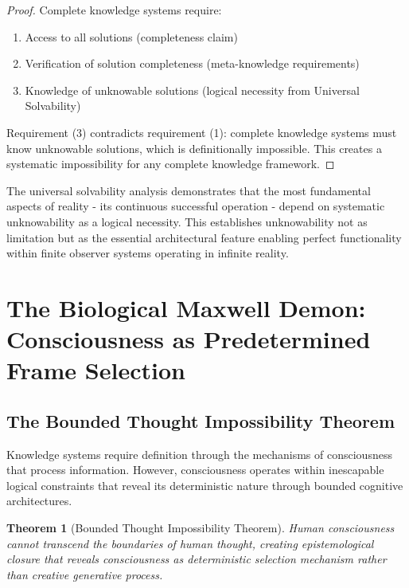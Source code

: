 \documentclass[12pt,a4paper]{article}
\newtheorem{theorem}{Theorem}[section]
\begin{document}
\begin{proof}
Complete knowledge systems require:
\begin{enumerate}
\item Access to all solutions (completeness claim)
\item Verification of solution completeness (meta-knowledge requirements)
\item Knowledge of unknowable solutions (logical necessity from Universal Solvability)
\end{enumerate}

Requirement (3) contradicts requirement (1): complete knowledge systems must know unknowable solutions, which is definitionally impossible. This creates a systematic impossibility for any complete knowledge framework.
\end{proof}

The universal solvability analysis demonstrates that the most fundamental aspects of reality - its continuous successful operation - depend on systematic unknowability as a logical necessity. This establishes unknowability not as limitation but as the essential architectural feature enabling perfect functionality within finite observer systems operating in infinite reality.

\section{The Biological Maxwell Demon: Consciousness as Predetermined Frame Selection}

\subsection{The Bounded Thought Impossibility Theorem}

Knowledge systems require definition through the mechanisms of consciousness that process information. However, consciousness operates within inescapable logical constraints that reveal its deterministic nature through bounded cognitive architectures.

\begin{theorem}[Bounded Thought Impossibility Theorem]
Human consciousness cannot transcend the boundaries of human thought, creating epistemological closure that reveals consciousness as deterministic selection mechanism rather than creative generative process.
\end{theorem}
\end{document}
